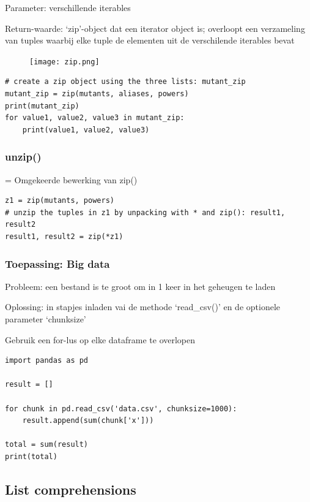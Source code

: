 \documentclass{article}
\begin{document}
Parameter: verschillende iterables

Return-waarde: `zip'-object dat een iterator object is;
overloopt een verzameling van tuples waarbij elke tuple de elementen
uit de verschilende iterables bevat

\begin{figure}[H]
    \centering
    \texttt{[image: zip.png]}
\end{figure}

\begin{verbatim}
# create a zip object using the three lists: mutant_zip
mutant_zip = zip(mutants, aliases, powers)
print(mutant_zip)
for value1, value2, value3 in mutant_zip:
    print(value1, value2, value3)
\end{verbatim}

\subsubsection{unzip()}

= Omgekeerde bewerking van zip()


\begin{verbatim}
z1 = zip(mutants, powers)
# unzip the tuples in z1 by unpacking with * and zip(): result1, result2
result1, result2 = zip(*z1)
\end{verbatim}

\subsubsection{Toepassing: Big data}

Probleem: een bestand is te groot om in 1 keer in het geheugen te laden

Oplossing: in stapjes inladen vai de methode `read\_csv()' en de optionele parameter `chunksize'

Gebruik een for-lus op elke dataframe te overlopen

\begin{verbatim}
import pandas as pd

result = []

for chunk in pd.read_csv('data.csv', chunksize=1000):
    result.append(sum(chunk['x']))

total = sum(result)
print(total)
\end{verbatim}

\subsection{List comprehensions}
\end{document}
